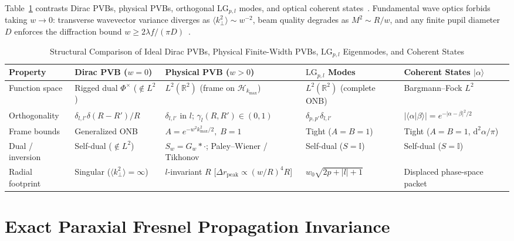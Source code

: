\documentclass{optica-article}
\newcommand{\braket}[2]{\langle #1 | #2 \rangle}
\newcommand{\ket}[1]{\lvert #1 \rangle}
\newcommand{\abs}[1]{\lvert #1 \rvert}
\newcommand{\dd}{\mathrm{d}}
\begin{document}
Table~\ref{tab:frame_hierarchy} contrasts Dirac PVBs, physical PVBs, orthogonal $\mathrm{LG}_{p,l}$ modes, and optical coherent states~\cite{Klauder1985,Perelomov1986,Gazeau2009,Gazeau2018,MoralesRodriguez2024OL,MoralesRodriguez2024PRA}. Fundamental wave optics forbids taking $w \to 0$: transverse wavevector variance diverges as $\langle k_\perp^2\rangle \sim w^{-2}$, beam quality degrades as $M^2 \sim R/w$, and any finite pupil diameter $D$ enforces the diffraction bound $w \ge 2\lambda f/(\pi D)$~\cite{Barral2017}.

\begin{table}[htbp]
  \centering
  \caption{Structural Comparison of Ideal Dirac PVBs, Physical Finite-Width PVBs, $\mathrm{LG}_{p,l}$ Eigenmodes, and Coherent States}
  \label{tab:frame_hierarchy}
  \scriptsize
  \renewcommand{\arraystretch}{1.16}
  \begin{tabularx}{\textwidth}{@{}lXXXX@{}}
  \toprule
  \textbf{Property} & \textbf{Dirac PVB ($w=0$)} & \textbf{Physical PVB ($w>0$)} & \textbf{$\mathrm{LG}_{p,l}$ Modes} & \textbf{Coherent States $\ket{\alpha}$} \\
  \midrule
  Function space & Rigged dual $\Phi^\times$ ($\notin L^2$) & $L^2(\mathbb{R}^2)$ (frame on $\mathcal{H}_{k_{\max}}$) & $L^2(\mathbb{R}^2)$ (complete ONB) & Bargmann--Fock $L^2$ \\
  Orthogonality & $\delta_{l,l'}\delta(R-R')/R$ & $\delta_{l,l'}$ in $l$; $\gamma_l(R,R')\in(0,1)$ & $\delta_{p,p'}\delta_{l,l'}$ & $\abs{\braket{\alpha}{\beta}} = e^{-\abs{\alpha-\beta}^2/2}$ \\
  Frame bounds & Generalized ONB & $A=e^{-w^2 k_{\max}^2/2},\; B=1$ & Tight ($A=B=1$) & Tight ($A=B=1$, $\dd^2\alpha/\pi$) \\
  Dual / inversion & Self-dual ($\notin L^2$) & $S_w = G_w * \cdot$; Paley--Wiener / Tikhonov & Self-dual ($S=\mathbb{I}$) & Self-dual ($S=\mathbb{I}$) \\
  Radial footprint & Singular ($\langle k_\perp^2\rangle=\infty$) & $l$-invariant $R$ [$\Delta r_{\mathrm{peak}}\propto (w/R)^4 R$] & $w_0\sqrt{2p+\abs{l}+1}$ & Displaced phase-space packet \\
  \bottomrule
  \end{tabularx}
\end{table}

\section{Exact Paraxial Fresnel Propagation Invariance}
\label{sec:fresnel}
\end{document}

